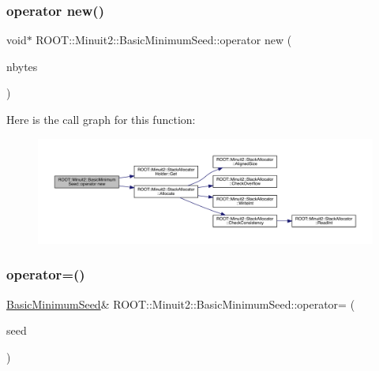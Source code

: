 \subsubsection{\texorpdfstring{operator new()}{operator new()}\hspace{0.1cm}{\footnotesize\ttfamily [2/2]}}
{\footnotesize\ttfamily void$\ast$ R\+O\+O\+T\+::\+Minuit2\+::\+Basic\+Minimum\+Seed\+::operator new (\begin{DoxyParamCaption}\item[{size\+\_\+t}]{nbytes }\end{DoxyParamCaption})\hspace{0.3cm}{\ttfamily [inline]}}

Here is the call graph for this function\+:
\nopagebreak
\begin{figure}[H]
\begin{center}
\leavevmode
\includegraphics[width=350pt]{de/d50/classROOT_1_1Minuit2_1_1BasicMinimumSeed_ae9ee17ec0140aa209e488b064675f3c3_cgraph}
\end{center}
\end{figure}
\mbox{\label{classROOT_1_1Minuit2_1_1BasicMinimumSeed_aeffefca123cbfd95d19fa7fb7e087431}} 
\subsubsection{\texorpdfstring{operator=()}{operator=()}\hspace{0.1cm}{\footnotesize\ttfamily [1/2]}}
{\footnotesize\ttfamily \mbox{\hyperlink{classROOT_1_1Minuit2_1_1BasicMinimumSeed}{Basic\+Minimum\+Seed}}\& R\+O\+O\+T\+::\+Minuit2\+::\+Basic\+Minimum\+Seed\+::operator= (\begin{DoxyParamCaption}\item[{const \mbox{\hyperlink{classROOT_1_1Minuit2_1_1BasicMinimumSeed}{Basic\+Minimum\+Seed}} \&}]{seed }\end{DoxyParamCaption})\hspace{0.3cm}{\ttfamily [inline]}}

